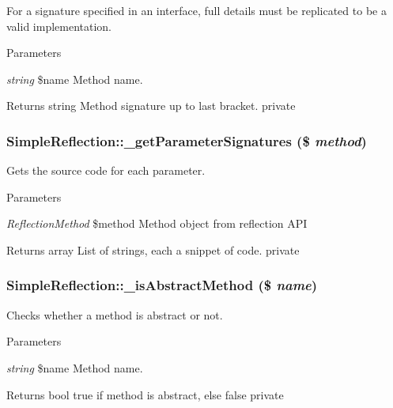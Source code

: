 \label{class_simple_reflection_ab1cf79a333f164b0ddba43126b3f1c55}
For a signature specified in an interface, full details must be replicated to be a valid implementation. 
\begin{DoxyParams}{Parameters}
\item[{\em string}]\$name Method name. \end{DoxyParams}
\begin{DoxyReturn}{Returns}
string Method signature up to last bracket.  private 
\end{DoxyReturn}
\hypertarget{class_simple_reflection_a491066d77b32606cfdb27a6afc8718f3}{
\subsubsection[{\_\-getParameterSignatures}]{\setlength{\rightskip}{0pt plus 5cm}SimpleReflection::\_\-getParameterSignatures (\$ {\em method})}}
\label{class_simple_reflection_a491066d77b32606cfdb27a6afc8718f3}
Gets the source code for each parameter. 
\begin{DoxyParams}{Parameters}
\item[{\em ReflectionMethod}]\$method Method object from reflection API \end{DoxyParams}
\begin{DoxyReturn}{Returns}
array List of strings, each a snippet of code.  private 
\end{DoxyReturn}
\hypertarget{class_simple_reflection_a1fe2493b64709f4a14be03cd7726e07f}{
\subsubsection[{\_\-isAbstractMethod}]{\setlength{\rightskip}{0pt plus 5cm}SimpleReflection::\_\-isAbstractMethod (\$ {\em name})}}
\label{class_simple_reflection_a1fe2493b64709f4a14be03cd7726e07f}
Checks whether a method is abstract or not. 
\begin{DoxyParams}{Parameters}
\item[{\em string}]\$name Method name. \end{DoxyParams}
\begin{DoxyReturn}{Returns}
bool true if method is abstract, else false  private 
\end{DoxyReturn}
